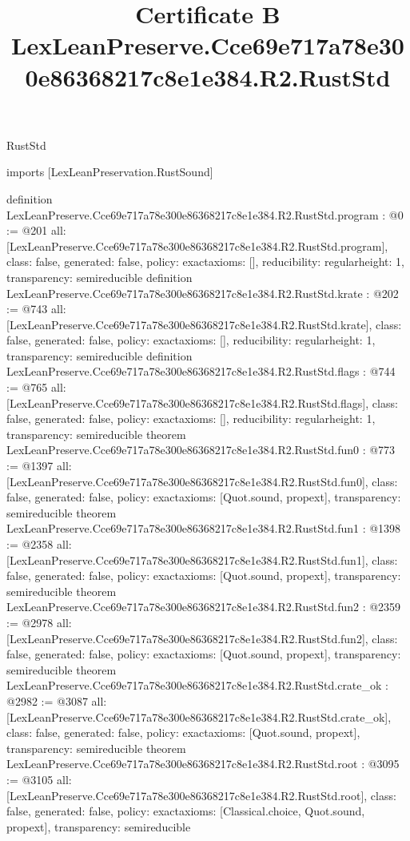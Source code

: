 \begin{lexlean}{RustStd}
\title{Certificate B LexLeanPreserve.Cce69e717a78e300e86368217c8e1e384.R2.RustStd}
\begin{coremodule}
imports [LexLeanPreservation.RustSound]

definition LexLeanPreserve.Cce69e717a78e300e86368217c8e1e384.R2.RustStd.program : @0 := @201 {
  all: [LexLeanPreserve.Cce69e717a78e300e86368217c8e1e384.R2.RustStd.program],
  class: false,
  generated: false,
  policy: exact{axioms: []},
  reducibility: regular{height: 1},
  transparency: semireducible
}
definition LexLeanPreserve.Cce69e717a78e300e86368217c8e1e384.R2.RustStd.krate : @202 := @743 {
  all: [LexLeanPreserve.Cce69e717a78e300e86368217c8e1e384.R2.RustStd.krate],
  class: false,
  generated: false,
  policy: exact{axioms: []},
  reducibility: regular{height: 1},
  transparency: semireducible
}
definition LexLeanPreserve.Cce69e717a78e300e86368217c8e1e384.R2.RustStd.flags : @744 := @765 {
  all: [LexLeanPreserve.Cce69e717a78e300e86368217c8e1e384.R2.RustStd.flags],
  class: false,
  generated: false,
  policy: exact{axioms: []},
  reducibility: regular{height: 1},
  transparency: semireducible
}
theorem LexLeanPreserve.Cce69e717a78e300e86368217c8e1e384.R2.RustStd.fun0 : @773 := @1397 {
  all: [LexLeanPreserve.Cce69e717a78e300e86368217c8e1e384.R2.RustStd.fun0],
  class: false,
  generated: false,
  policy: exact{axioms: [Quot.sound, propext]},
  transparency: semireducible
}
theorem LexLeanPreserve.Cce69e717a78e300e86368217c8e1e384.R2.RustStd.fun1 : @1398 := @2358 {
  all: [LexLeanPreserve.Cce69e717a78e300e86368217c8e1e384.R2.RustStd.fun1],
  class: false,
  generated: false,
  policy: exact{axioms: [Quot.sound, propext]},
  transparency: semireducible
}
theorem LexLeanPreserve.Cce69e717a78e300e86368217c8e1e384.R2.RustStd.fun2 : @2359 := @2978 {
  all: [LexLeanPreserve.Cce69e717a78e300e86368217c8e1e384.R2.RustStd.fun2],
  class: false,
  generated: false,
  policy: exact{axioms: [Quot.sound, propext]},
  transparency: semireducible
}
theorem LexLeanPreserve.Cce69e717a78e300e86368217c8e1e384.R2.RustStd.crate_ok : @2982 := @3087 {
  all: [LexLeanPreserve.Cce69e717a78e300e86368217c8e1e384.R2.RustStd.crate_ok],
  class: false,
  generated: false,
  policy: exact{axioms: [Quot.sound, propext]},
  transparency: semireducible
}
theorem LexLeanPreserve.Cce69e717a78e300e86368217c8e1e384.R2.RustStd.root : @3095 := @3105 {
  all: [LexLeanPreserve.Cce69e717a78e300e86368217c8e1e384.R2.RustStd.root],
  class: false,
  generated: false,
  policy: exact{axioms: [Classical.choice, Quot.sound, propext]},
  transparency: semireducible
}


\end{coremodule}
\end{lexlean}
